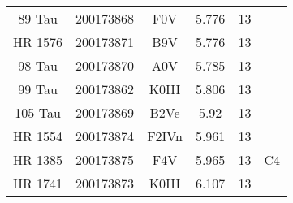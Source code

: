 \begin{table*}
\begin{tabular}{cccccc}
89 Tau & 200173868 & F0V & 5.776 & 13 &  \\
HR 1576 & 200173871 & B9V & 5.776 & 13 &  \\
98 Tau & 200173870 & A0V & 5.785 & 13 &  \\
99 Tau & 200173862 & K0III & 5.806 & 13 &  \\
105 Tau & 200173869 & B2Ve & 5.92 & 13 &  \\
HR 1554 & 200173874 & F2IVn & 5.961 & 13 &  \\
HR 1385 & 200173875 & F4V & 5.965 & 13 & C4 \\
HR 1741 & 200173873 & K0III & 6.107 & 13 &  \\
\hline
\end{tabular}
\end{table*}
